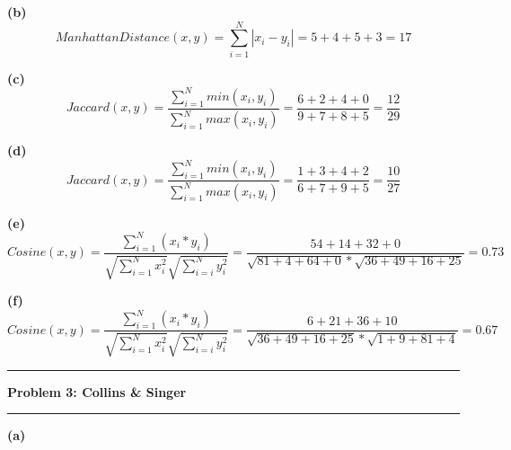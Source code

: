 \documentclass[11pt]{article}
\newcommand\question[2]{\vspace{.25in}\hrule\textbf{#1: #2}\vspace{.5em}\hrule\vspace{.10in}}
\renewcommand\part[1]{\vspace{.10in}\textbf{(#1)}}
\begin{document}
\part{b}
$$ManhattanDistance(x, y) = \sum_{i = 1}^N |x_i - y_i| = 5 + 4 + 5 + 3 = 17$$


\part{c}
$$Jaccard(x, y) = \frac{\sum_{i = 1}^N min(x_i, y_i)}{\sum_{i = 1}^N max(x_i, y_i)} = \frac{6 + 2 + 4 + 0}{9 + 7 + 8 + 5} = \frac{12}{29}$$


\part{d}
$$Jaccard(x, y) = \frac{\sum_{i = 1}^N min(x_i, y_i)}{\sum_{i = 1}^N max(x_i, y_i)} = \frac{1 + 3 + 4 + 2}{6 + 7 + 9 + 5} = \frac{10}{27}$$


\part{e}
$$Cosine(x, y) = \frac{\sum_{i = 1}^N (x_i * y_i)}{\sqrt{\sum_{i = 1}^N x_i^2}\sqrt{\sum_{i = i}^N y_i^2}} = \frac{54 + 14 + 32 + 0}{\sqrt{81 + 4 + 64 + 0}*\sqrt{36 + 49 + 16 + 25}} = 0.73$$


\part{f}
$$Cosine(x, y) = \frac{\sum_{i = 1}^N (x_i * y_i)}{\sqrt{\sum_{i = 1}^N x_i^2}\sqrt{\sum_{i = i}^N y_i^2}} = \frac{6 + 21 + 36 + 10}{\sqrt{36 + 49 + 16 + 25}*\sqrt{1 + 9 + 81 + 4}} = 0.67$$


\question{Problem 3}{Collins \& Singer}

\part{a}
\end{document}
